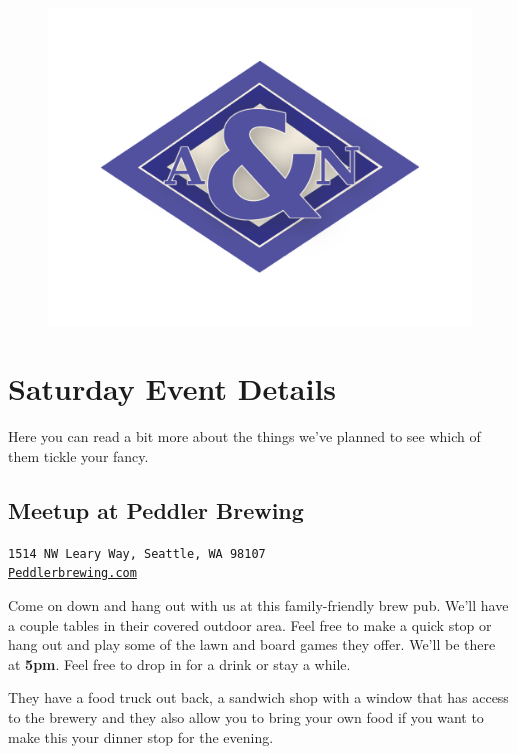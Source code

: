 \documentclass[10pt]{article}
\begin{document}
\newpage
$\,$
\vspace{1in}
\begin{figure}[h]
    \centering
    \includegraphics[width=\textwidth]{logo-navy-80}
\end{figure}

\newpage

\section{Saturday Event Details}
Here you can read a bit more about the things we've planned to see which of them tickle your fancy.

\subsection{Meetup at Peddler Brewing}
\label{subsec-dinner-sat}
\begin{center}
    \texttt{1514 NW Leary Way, Seattle, WA 98107\\\href{Peddlerbrewing.com}{Peddlerbrewing.com}}
\end{center}

    Come on down and hang out with us at this family-friendly brew pub. We'll have a couple tables 
    in their covered outdoor area. Feel free to make a quick stop or hang out and play some of the 
    lawn and board games they offer. We'll be there at \textbf{5pm}. Feel free to drop in for a drink or stay a while.
    
    They have a food truck out back, a sandwich shop with a window 
    that has access to the brewery and they also allow you to bring your own food if you want to make 
    this your dinner stop for the evening. 
\end{document}

